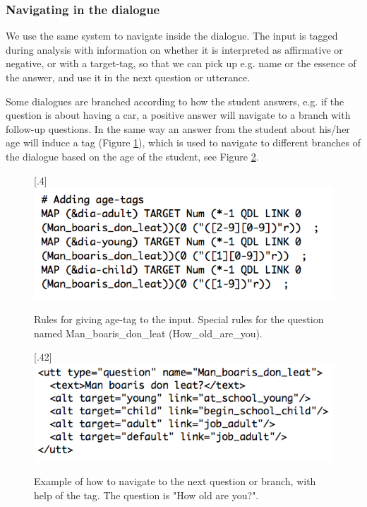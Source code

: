 \documentclass[11pt]{article}
\begin{document}
\subsubsection{Navigating in the dialogue}\label{navigation}
We use the same system to navigate inside the dialogue. The input is tagged during analysis with information on whether it is interpreted as affirmative or negative, or with a target-tag, so that we can pick up e.g. name or the essence of the answer, and use it in the next question or utterance. 

Some dialogues are branched according to how the student answers, e.g. if the question is about having a car, a positive answer will navigate to a branch with follow-up questions. In the same way an answer from the student about his/her age will induce a tag (Figure \ref{age}), which is used to navigate to different branches of the dialogue based on the age of the student, see Figure \ref{branch}.


\begin{figure}[htbp]
\begin{center}
\scalebox{.4}[.4]{\includegraphics{presentation/img/picking_age2.png}}\\
\caption{Rules for giving age-tag to the input. Special rules for the question named Man\_boaris\_don\_leat (How\_old\_are\_you).}
\label{age}
\end{center}
\end{figure}


\begin{figure}[htbp]
\begin{center}
\scalebox{.42}[.42]{\includegraphics{presentation/img/Man_boarisEng.png}}\\
\caption{Example of how to navigate to the next question or branch, with help of the tag. The question is "How old are you?".}
\label{branch}
\end{center}
\end{figure}
\end{document}
